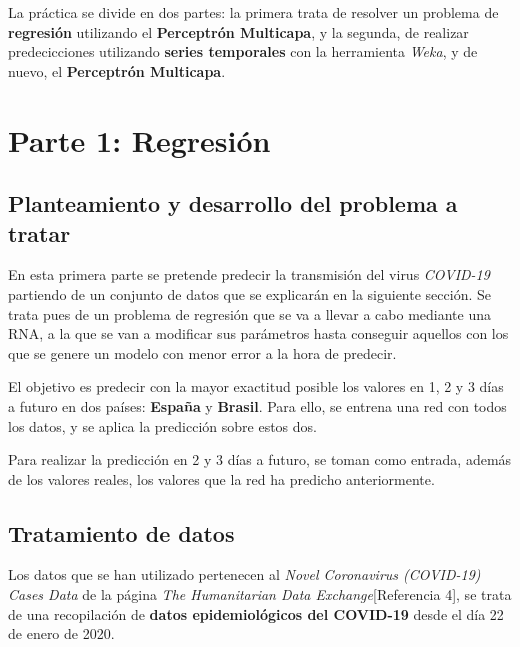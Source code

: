 \documentclass[12pt,a4paper, xcolor=table]{article}
\begin{document}
  \vspace{5mm}

   La práctica se divide en dos partes: la primera trata de resolver un problema de \textbf{regresión} utilizando el \textbf{Perceptrón Multicapa}, y la segunda, de realizar predecicciones utilizando \textbf{series temporales} con la herramienta \textit{Weka}, y de nuevo, el \textbf{Perceptrón Multicapa}.

\newpage


\section{Parte 1: Regresión}

    \subsection{Planteamiento y desarrollo del problema a tratar}

    En esta primera parte se pretende predecir la transmisión del virus \textit{COVID-19} partiendo de un conjunto de datos que se explicarán en la siguiente sección. Se trata pues de un problema de regresión que se va a llevar a cabo mediante una RNA, a la que se van a modificar sus parámetros hasta conseguir aquellos con los que se genere un modelo con menor error a la hora de predecir.

    \vspace{2mm}

    El objetivo es predecir con la mayor exactitud posible los valores en 1, 2 y 3 días a futuro en dos países: \textbf{España} y \textbf{Brasil}. Para ello, se entrena una red con todos los datos, y se aplica la predicción sobre estos dos.

    \vspace{2mm}

    Para realizar la predicción en 2 y 3 días a futuro, se toman como entrada, además de los valores reales, los valores que la red ha predicho anteriormente.




    \subsection{Tratamiento de datos}

    Los datos que se han utilizado pertenecen al \textit{Novel Coronavirus (COVID-19) Cases Data} de la página \textit{The Humanitarian Data Exchange}[Referencia 4], se trata de una recopilación de \textbf{datos epidemiológicos del COVID-19} desde el día 22 de enero de 2020.
\end{document}
